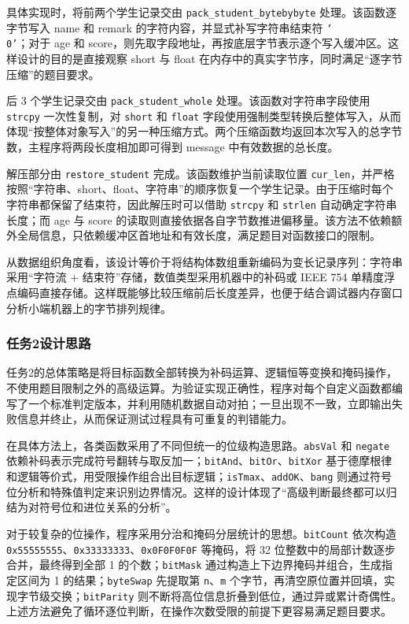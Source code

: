 \documentclass[supercite]{Experimental_Report}
\theoremstyle{definition}
\begin{document}
具体实现时，将前两个学生记录交由 \texttt{pack\_student\_bytebybyte} 处理。该函数逐字节写入 name 和 remark 的字符内容，并显式补写字符串结束符 \texttt{'\\0'}；对于 age 和 score，则先取字段地址，再按底层字节表示逐个写入缓冲区。这样设计的目的是直接观察 short 与 float 在内存中的真实字节序，同时满足“逐字节压缩”的题目要求。

后 3 个学生记录交由 \texttt{pack\_student\_whole} 处理。该函数对字符串字段使用 \texttt{strcpy} 一次性复制，对 \texttt{short} 和 \texttt{float} 字段使用强制类型转换后整体写入，从而体现“按整体对象写入”的另一种压缩方式。两个压缩函数均返回本次写入的总字节数，主程序将两段长度相加即可得到 message 中有效数据的总长度。

解压部分由 \texttt{restore\_student} 完成。该函数维护当前读取位置 \texttt{cur\_len}，并严格按照“字符串、short、float、字符串”的顺序恢复一个学生记录。由于压缩时每个字符串都保留了结束符，因此解压时可以借助 \texttt{strcpy} 和 \texttt{strlen} 自动确定字符串长度；而 age 与 score 的读取则直接依据各自字节数推进偏移量。该方法不依赖额外全局信息，只依赖缓冲区首地址和有效长度，满足题目对函数接口的限制。

从数据组织角度看，该设计等价于将结构体数组重新编码为变长记录序列：字符串采用“字符流 + 结束符”存储，数值类型采用机器中的补码或 IEEE 754 单精度浮点编码直接存储。这样既能够比较压缩前后长度差异，也便于结合调试器内存窗口分析小端机器上的字节排列规律。

\subsubsection{任务2设计思路}
任务2的总体策略是将目标函数全部转换为补码运算、逻辑恒等变换和掩码操作，不使用题目限制之外的高级运算。为验证实现正确性，程序对每个自定义函数都编写了一个标准判定版本，并利用随机数据自动对拍；一旦出现不一致，立即输出失败信息并终止，从而保证测试过程具有可重复的判错能力。

在具体方法上，各类函数采用了不同但统一的位级构造思路。\texttt{absVal} 和 \texttt{negate} 依赖补码表示完成符号翻转与取反加一；\texttt{bitAnd}、\texttt{bitOr}、\texttt{bitXor} 基于德摩根律和逻辑等价式，用受限操作组合出目标逻辑；\texttt{isTmax}、\texttt{addOK}、\texttt{bang} 则通过符号位分析和特殊值判定来识别边界情况。这样的设计体现了“高级判断最终都可以归结为对符号位和进位关系的分析”。

对于较复杂的位操作，程序采用分治和掩码分层统计的思想。\texttt{bitCount} 依次构造 \texttt{0x55555555}、\texttt{0x33333333}、\texttt{0x0F0F0F0F} 等掩码，将 32 位整数中的局部计数逐步合并，最终得到全部 1 的个数；\texttt{bitMask} 通过构造上下边界掩码并组合，生成指定区间为 1 的结果；\texttt{byteSwap} 先提取第 \texttt{n}、\texttt{m} 个字节，再清空原位置并回填，实现字节级交换；\texttt{bitParity} 则不断将高位信息折叠到低位，通过异或累计奇偶性。上述方法避免了循环逐位判断，在操作次数受限的前提下更容易满足题目要求。
\end{document}

